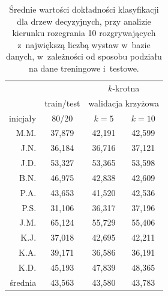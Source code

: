 \documentclass[a4paper,twoside,12pt]{book}
\begin{document}
\begin{table}
\centering
\caption{Średnie wartości dokładności klasyfikacji dla drzew decyzyjnych, przy analizie kierunku rozegrania 10 rozgrywających z~największą liczbą wystaw w~bazie danych, w~zależności od sposobu podziału na dane treningowe i~testowe.}
\label{tab:drzewaKierunekSredniaFolds}
\begin{tabular}{rccc}
\toprule
 &            & \multicolumn{2}{c}{$k$-krotna}\\
 & train/test & \multicolumn{2}{c}{walidacja krzyżowa}\\
 \cmidrule{3-4}
inicjały & 80/20 & $k=5$ & $k=10$ \\
\midrule
M.M. & 37,879 & 42,191 & 42,599 \\ 
J.N. & 36,184 & 36,716 & 37,121 \\ 
J.D. & 53,327 & 53,365 & 53,598 \\ 
B.N. & 46,975 & 42,838 & 42,609 \\ 
P.A. & 43,653 & 41,520 & 42,536 \\ 
P.S. & 31,106 & 36,317 & 37,196 \\ 
J.M. & 65,124 & 55,729 & 55,406 \\ 
K.J. & 37,018 & 42,695 & 42,211 \\ 
K.A. & 39,171 & 36,586 & 36,191 \\ 
K.D. & 45,193 & 47,839 & 48,365\\ 
\midrule 
{średnia} & {43,563} & {43,580} & {43,783} \\
\bottomrule
\end{tabular}
\end{table}
\end{document}
